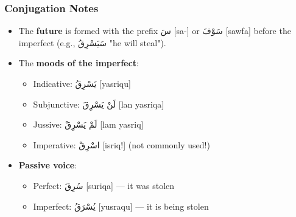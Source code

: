 \documentclass[letter,12pt]{article}
\begin{document}
\subsubsection*{Conjugation Notes}
\begin{itemize}
  \item The \textbf{future} is formed with the prefix \textarabic{سَ} [sa-] or \textarabic{سَوْفَ} [sawfa] before the imperfect (e.g., \textarabic{سَيَسْرِقُ} "he will steal").
  \item The \textbf{moods of the imperfect}: 
    \begin{itemize}
      \item Indicative: \textarabic{يَسْرِقُ} [yasriqu] 
      \item Subjunctive: \textarabic{لَنْ يَسْرِقَ} [lan yasriqa]
      \item Jussive: \textarabic{لَمْ يَسْرِقْ} [lam yasriq]
      \item Imperative: \textarabic{اسْرِقْ} [isriq!] (not commonly used!)
    \end{itemize}
  \item \textbf{Passive voice}: 
    \begin{itemize}
      \item Perfect: \textarabic{سُرِقَ} [suriqa] — it was stolen
      \item Imperfect: \textarabic{يُسْرَقُ} [yusraqu] — it is being stolen
    \end{itemize}
\end{itemize}
\end{document}
